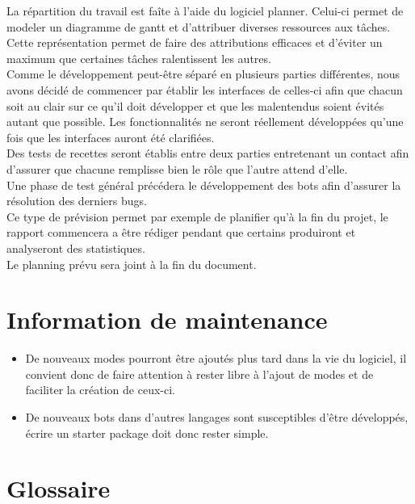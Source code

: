 \documentclass[12pt]{article}
\begin{document}
La répartition du travail est faîte à l'aide du logiciel planner. Celui-ci
permet de modeler un diagramme de gantt et d'attribuer diverses ressources aux
tâches. Cette représentation permet de faire des attributions efficaces et
d'éviter un maximum que certaines tâches ralentissent les autres.\\

Comme le développement peut-être séparé en plusieurs parties différentes, nous
avons décidé de commencer par établir les interfaces de celles-ci afin que
chacun soit au clair sur ce qu'il doit développer et que les malentendus soient
évités autant que possible. Les fonctionnalités ne seront réellement développées
qu'une fois que les interfaces auront été clarifiées.\\

Des tests de recettes seront établis entre deux parties entretenant un contact
afin d'assurer que chacune remplisse bien le rôle que l'autre attend d'elle.\\

Une phase de test général précédera le développement des bots afin d'assurer la
résolution des derniers bugs.\\

Ce type de prévision permet par exemple de planifier qu'à la fin du projet, le
rapport commencera a être rédiger pendant que certains produiront et analyseront
des statistiques.\\

Le planning prévu sera joint à la fin du document.


\section{Information de maintenance}

\begin{itemize}
\item De nouveaux modes pourront être ajoutés plus tard dans la vie du logiciel, il convient donc de faire attention à rester libre à l'ajout de modes et de faciliter la création de ceux-ci.
\item De nouveaux bots dans d'autres langages sont susceptibles d'être développés, écrire un starter package doit donc rester simple.
\end{itemize}

\section{Glossaire}
\end{document}

